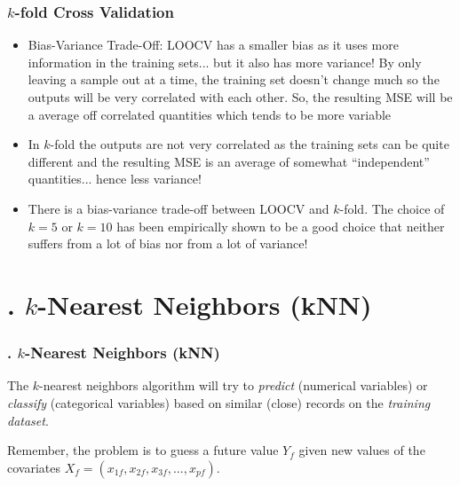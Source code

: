 \documentclass[flegn]{beamer}
\newcommand{\skoo}{\vspace{.2in}}
\begin{document}
\begin{frame}
\frametitle{$k$-fold Cross Validation}
\begin{itemize}
\item {\color{blue} Bias-Variance Trade-Off:} LOOCV has a smaller bias as it uses more information in the training sets... but it also has more variance! By only leaving a sample out at a time, the training set doesn't change much so the outputs will be very correlated with each other. So, the resulting MSE will be a average off correlated quantities which tends to be more variable
\item In $k$-fold the outputs are not very correlated as the training sets can be quite different and the resulting MSE is an average of somewhat ``independent'' quantities... hence less variance! 
\item {\color{red}There is a bias-variance trade-off between LOOCV and $k$-fold. The choice of $k=5$ or $k=10$ has been empirically shown to be a good choice that neither suffers from a lot of bias nor from a lot of variance!}
\end{itemize}
\end{frame}




\section{. $k$-Nearest Neighbors (kNN)}
\begin{frame}
\frametitle{. $k$-Nearest Neighbors (kNN)}

The {\color{blue}$k$-nearest neighbors} algorithm will try to {\it predict} (numerical variables) or {\it classify} (categorical variables) based on {\color{blue}similar (close) records} on the {\it training dataset}. 

\skoo

Remember, the problem is to guess a future value $Y_f$ given new values of  the covariates $X_f = (x_{1f}, x_{2f}, x_{3f}, \dots, x_{pf})$.

\end{frame}
\end{document}
